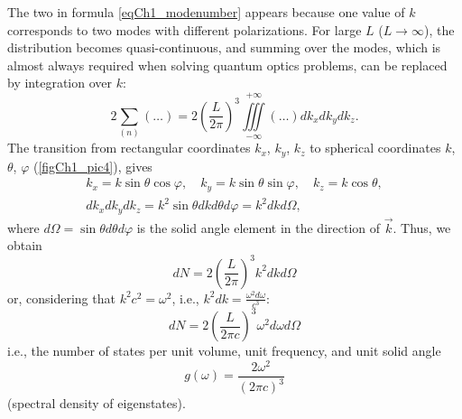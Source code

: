 The two in formula \eqref{eqCh1_modenumber} appears because one value of $k$ corresponds to two modes with different polarizations. For large $L$ ($L\rightarrow \infty$), the distribution becomes quasi-continuous, and summing over the modes, which is almost always required when solving quantum optics problems, can be replaced by integration over $k$: 
\begin{equation}
2 \sum_{(n)} \left( \dots \right) = 2 \left(\frac{L}{2 \pi} \right)^3 \iiint\limits_{-\infty}^{+\infty} \left( \dots \right) d k_x d k_y d k_z.
\label{eqCh1_modenumber_kvazy_contig}
\end{equation}
The transition from rectangular coordinates $k_x$, $k_y$, $k_z$ to spherical coordinates $k$, $\theta$, $\varphi$ (\autoref{figCh1_pic4}), gives
\begin{eqnarray}
k_x = k \sin \theta \cos \varphi, \quad k_y = k \sin \theta \sin \varphi, \quad k_z  = k \cos \theta, \nonumber \\
d k_x d k_y d k_z = k^2 \sin \theta d k d \theta d \varphi = k^2 d k d \Omega,
\end{eqnarray}
where $d \Omega = \sin \theta d \theta d \varphi$ is the solid angle element in the direction of $\vec{k}$. Thus, we obtain
\begin{equation}
d N = 2 \left(\frac{L}{2 \pi} \right)^3 k^2 d k d \Omega
\label{eqCh1_modenumber_1pre}
\end{equation}
or, considering that $k^2 c^2 = \omega^2$, i.e., $k^2 d k = \frac{\omega^2 d \omega}{c^3}$: 
\begin{equation}
d N = 2 \left(\frac{L}{2 \pi c} \right)^3 \omega^2 d \omega d \Omega
\label{eqCh1_modenumber_1}
\end{equation}
i.e., the number of states per unit volume, unit frequency, and unit solid angle
\begin{equation}
g\left(\omega\right)  = \frac{2 \omega^2}{\left(2 \pi c\right)^3}
\end{equation}
(spectral density of eigenstates). 